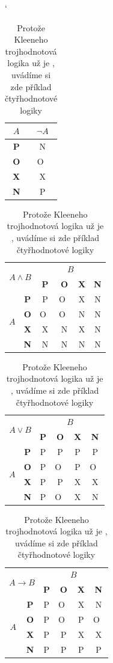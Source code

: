 \documentclass[11pt,a4paper]{article}
\begin{document}
\begin{table}[h]
\catcode`
\begin{center}
	\begin{tabular}{|c|c|} \hline
		$A$ & $\neg A$ \\ \hline
		\textbf{P} & N \\ \hline
		\textbf{O} & O~\\ \hline
		\textbf{X} & X \\ \hline
		\textbf{N} & P \\ \hline
	\end{tabular}
	\begin{tabular}{|c|c|c|c|c|c|} \hline
		\multicolumn{2}{|c|}{\multirow{2}{*}{$A \wedge B$}} & \multicolumn{4}{|c|}{$B$} \\ \cline{3-6}
		\multicolumn{2}{|c|}{} & \textbf{P} & \textbf{O} & \textbf{X} & \textbf{N} \\ \hline
		\multirow{4}{*}{$A$} & \textbf{P} & P & O~& X & N \\ \cline{2-6}
		& \textbf{O} & O~& O~& N & N \\ \cline{2-6}
		& \textbf{X} & X & N & X & N \\ \cline{2-6}
		& \textbf{N} & N & N & N & N \\ \hline
	\end{tabular}
	\begin{tabular}{|c|c|c|c|c|c|} \hline
		\multicolumn{2}{|c|}{\multirow{2}{*}{$A \vee B$}} & \multicolumn{4}{|c|}{$B$} \\ \cline{3-6}
		\multicolumn{2}{|c|}{} & \textbf{P} & \textbf{O} & \textbf{X} & \textbf{N} \\ \hline
		\multirow{4}{*}{$A$} & \textbf{P} & P & P & P & P \\ \cline{2-6}
		& \textbf{O} & P & O~& P & O~\\ \cline{2-6}
		& \textbf{X} & P & P & X & X \\ \cline{2-6}
		& \textbf{N} & P & O~& X & N \\ \hline
	\end{tabular}
	\begin{tabular}{|c|c|c|c|c|c|} \hline
		\multicolumn{2}{|c|}{\multirow{2}{*}{$A \rightarrow B$}} & \multicolumn{4}{|c|}{$B$} \\ \cline{3-6}
		\multicolumn{2}{|c|}{} & \textbf{P} & \textbf{O} & \textbf{X} & \textbf{N} \\ \hline
		\multirow{4}{*}{$A$} & \textbf{P} & P & O~& X & N \\ \cline{2-6}
		& \textbf{O} & P & O~& P & O~\\ \cline{2-6}
		& \textbf{X} & P & P & X & X \\ \cline{2-6}
		& \textbf{N} & P & P & P & P \\ \hline
	\end{tabular}	
\caption{Protože Kleeneho trojhodnotová logika už je , uvádíme si zde příklad čtyřhodnotové logiky}
\label{tab:logika}
\end{center}
\end{table}
\end{document}
